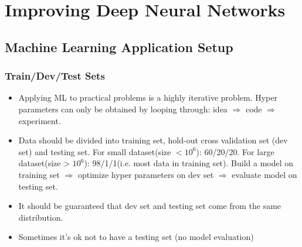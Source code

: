 \ifx\PREAMBLE\undefined


\fi
\chapter{Improving Deep Neural Networks}
\section{Machine Learning Application Setup}
\subsection{Train/Dev/Test Sets}
\begin{itemize}
  \item Applying ML to practical problems is a highly iterative problem. Hyper parameters can only be obtained by looping through: idea $\Rightarrow$ code $\Rightarrow$ experiment.
  \item Data should be divided into training set, hold-out cross validation set (dev set) and testing set. For small dataset(size $<10^6$): 60/20/20. For large dataset(size > $10^6$): 98/1/1(i.e. most data in training set). Build a model on training set $\Rightarrow$ optimize hyper parameters on dev set $\Rightarrow$ evaluate model on testing set. 
  \item It should be guaranteed that dev set and testing set come from the same distribution.
  \item Sometimes it's ok not to have a testing set (no model evaluation)
\end{itemize}
